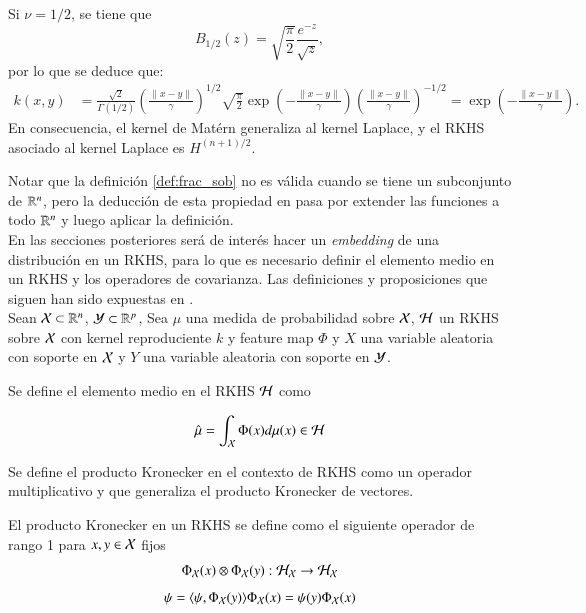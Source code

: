 \begin{obs}
    Si \( \nu = 1/2 \), se tiene que
\[
B_{1/2} (z) = \sqrt{ \frac{\pi}{2} } \frac{e^{-z}}{\sqrt{z}},
\]
por lo que se deduce que:
\[
\begin{aligned}
k (x,y) &= \frac{\sqrt{2}}{\Gamma(1/2)} \left(  \frac{\|x-y\|}{\gamma} \right)^{1/2} \sqrt{ \frac{\pi}{2} } \exp \left( -\frac{\|x-y\|}{\gamma} \right) \left(  \frac{\|x-y\|}{\gamma} \right)^{-1/2} = \exp \left( -\frac{\|x-y\|}{\gamma} \right).
\end{aligned}
\]
En consecuencia, el kernel de Matérn generaliza al kernel Laplace, y el RKHS asociado al kernel Laplace es \( H^{(n+1)/2} \).
\end{obs}
Notar que la definición \ref{def:frac_sob} no es válida cuando se tiene un subconjunto de $\mathbb{R}^n$, pero la deducción de esta propiedad en \cite{Wendland2004ScatteredApproximation} pasa por extender las funciones a todo $\mathbb{R}^n$ y luego aplicar la definición. \\
En las secciones posteriores será de interés hacer un \textit{embedding} de una distribución en un RKHS, para lo que es necesario definir el elemento medio en un RKHS y los operadores de covarianza. Las definiciones y proposiciones que siguen han sido expuestas en \cite{Fukumizu2004DimensionalitySpaces, Song2009HilbertSystems, Muandet2017KernelBeyond}. \\
Sean $\mathcal{X} \subset \mathbb{R}^n$, $\mathcal{Y} \subset \mathbb{R}^p$,  Sea $\mu$ una medida de probabilidad sobre $\mathcal{X}$, $\mathcal{H}$ un RKHS sobre $\mathcal{X}$ con kernel reproduciente $k$ y feature map $\Phi$ y $X$ una variable aleatoria con soporte en $\mathcal{X}$ y $Y$ una variable aleatoria con soporte en $\mathcal{Y}$.
\begin{defn}
	Se define el elemento medio en el RKHS $\mathcal{H}$ como
	
	\begin{equation*}
		\hat \mu = \int_{\mathcal{X}} \Phi (x) d \mu (x) \in \mathcal{H}
	\end{equation*}
\end{defn}
Se define el producto Kronecker en el contexto de RKHS como un operador multiplicativo y que generaliza el producto Kronecker de vectores.
\begin{defn}
    El producto Kronecker en un RKHS se define como
    el siguiente operador de rango 1 para $x, y \in \mathcal{X}$ fijos
	$$ \Phi_{\mathcal{X}} (x) \otimes \Phi_{\mathcal{X}}(y) : \mathcal{H}_{\mathcal{X}} \to \mathcal{H}_{\mathcal{X}}$$
	\begin{equation*}
		[\Phi_\X (x) \otimes \Phi_\X(y)] \psi = \langle \psi, \Phi_\X (y) \rangle \Phi_\X (x) = \psi (y) \Phi_\X (x)
	\end{equation*}
\end{defn}

